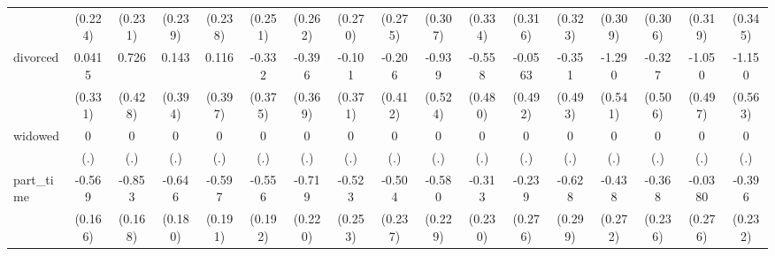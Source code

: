 {\begin{tabular}{l*{16}{c}}
                    &     (0.224)         &     (0.231)         &     (0.239)         &     (0.238)         &     (0.251)         &     (0.262)         &     (0.270)         &     (0.275)         &     (0.307)         &     (0.334)         &     (0.316)         &     (0.323)         &     (0.309)         &     (0.306)         &     (0.319)         &     (0.345)         \\
[1em]
divorced            &      0.0415         &       0.726         &       0.143         &       0.116         &      -0.332         &      -0.396         &      -0.101         &      -0.206         &      -0.939         &      -0.558         &     -0.0563         &      -0.351         &      -1.290\sym{*}  &      -0.327         &      -1.050\sym{*}  &      -1.150\sym{*}  \\
                    &     (0.331)         &     (0.428)         &     (0.394)         &     (0.397)         &     (0.375)         &     (0.369)         &     (0.371)         &     (0.412)         &     (0.524)         &     (0.480)         &     (0.492)         &     (0.493)         &     (0.541)         &     (0.506)         &     (0.497)         &     (0.563)         \\
[1em]
widowed             &           0         &           0         &           0         &           0         &           0         &           0         &           0         &           0         &           0         &           0         &           0         &           0         &           0         &           0         &           0         &           0         \\
                    &         (.)         &         (.)         &         (.)         &         (.)         &         (.)         &         (.)         &         (.)         &         (.)         &         (.)         &         (.)         &         (.)         &         (.)         &         (.)         &         (.)         &         (.)         &         (.)         \\
[1em]
part\_time           &      -0.569\sym{***}&      -0.853\sym{***}&      -0.646\sym{***}&      -0.597\sym{**} &      -0.556\sym{**} &      -0.719\sym{**} &      -0.523\sym{*}  &      -0.504\sym{*}  &      -0.580\sym{*}  &      -0.313         &      -0.239         &      -0.628\sym{*}  &      -0.438         &      -0.368         &     -0.0380         &      -0.396         \\
                    &     (0.166)         &     (0.168)         &     (0.180)         &     (0.191)         &     (0.192)         &     (0.220)         &     (0.253)         &     (0.237)         &     (0.229)         &     (0.230)         &     (0.276)         &     (0.299)         &     (0.272)         &     (0.236)         &     (0.276)         &     (0.232)         \\

\end{tabular}}
